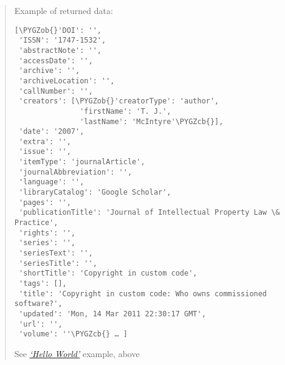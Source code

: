 \documentclass[letterpaper,10pt,english]{sphinxmanual}
\def\PYGZob{\char`\{}
\def\PYGZcb{\char`\}}
\begin{document}
\label{index:returned}\begin{quote}

Example of returned data:

\begin{Verbatim}[commandchars=\\\{\}]
[\PYGZob{}'DOI': '',
 'ISSN': '1747-1532',
 'abstractNote': '',
 'accessDate': '',
 'archive': '',
 'archiveLocation': '',
 'callNumber': '',
 'creators': [\PYGZob{}'creatorType': 'author',
               'firstName': 'T. J.',
               'lastName': 'McIntyre'\PYGZcb{}],
 'date': '2007',
 'extra': '',
 'issue': '',
 'itemType': 'journalArticle',
 'journalAbbreviation': '',
 'language': '',
 'libraryCatalog': 'Google Scholar',
 'pages': '',
 'publicationTitle': 'Journal of Intellectual Property Law \& Practice',
 'rights': '',
 'series': '',
 'seriesText': '',
 'seriesTitle': '',
 'shortTitle': 'Copyright in custom code',
 'tags': [],
 'title': 'Copyright in custom code: Who owns commissioned software?',
 'updated': 'Mon, 14 Mar 2011 22:30:17 GMT',
 'url': '',
 'volume': ''\PYGZcb{} … ]
\end{Verbatim}

See {\hyperref[index:hello-world]{\emph{`Hello World'}}} example, above
\end{quote}
\end{document}
